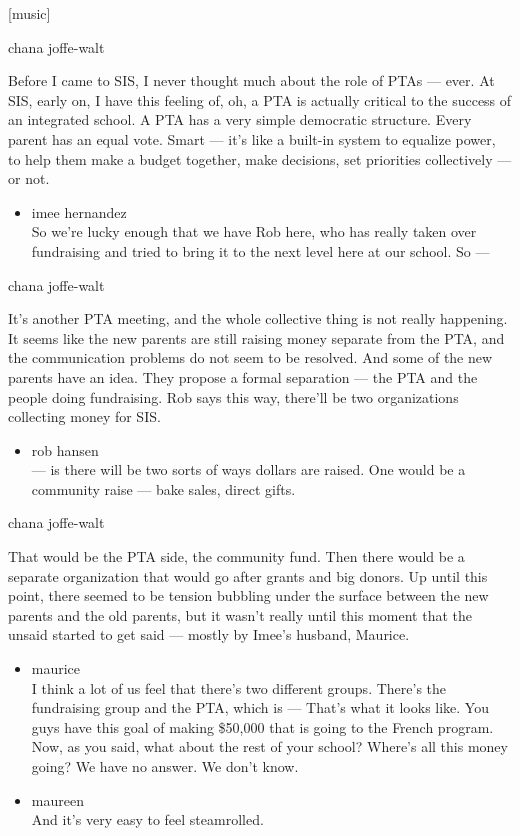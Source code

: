 {[}music{]}

chana joffe-walt

Before I came to SIS, I never thought much about the role of PTAs ---
ever. At SIS, early on, I have this feeling of, oh, a PTA is actually
critical to the success of an integrated school. A PTA has a very simple
democratic structure. Every parent has an equal vote. Smart --- it's
like a built-in system to equalize power, to help them make a budget
together, make decisions, set priorities collectively --- or not.

\begin{itemize}
\tightlist
\item
  imee hernandez\\
  So we're lucky enough that we have Rob here, who has really taken over
  fundraising and tried to bring it to the next level here at our
  school. So ---
\end{itemize}

chana joffe-walt

It's another PTA meeting, and the whole collective thing is not really
happening. It seems like the new parents are still raising money
separate from the PTA, and the communication problems do not seem to be
resolved. And some of the new parents have an idea. They propose a
formal separation --- the PTA and the people doing fundraising. Rob says
this way, there'll be two organizations collecting money for SIS.

\begin{itemize}
\tightlist
\item
  rob hansen\\
  --- is there will be two sorts of ways dollars are raised. One would
  be a community raise --- bake sales, direct gifts.
\end{itemize}

chana joffe-walt

That would be the PTA side, the community fund. Then there would be a
separate organization that would go after grants and big donors. Up
until this point, there seemed to be tension bubbling under the surface
between the new parents and the old parents, but it wasn't really until
this moment that the unsaid started to get said --- mostly by Imee's
husband, Maurice.

\begin{itemize}
\item
  maurice\\
  I think a lot of us feel that there's two different groups. There's
  the fundraising group and the PTA, which is --- That's what it looks
  like. You guys have this goal of making \$50,000 that is going to the
  French program. Now, as you said, what about the rest of your school?
  Where's all this money going? We have no answer. We don't know.
\item
  maureen\\
  And it's very easy to feel steamrolled.
\end{itemize}

